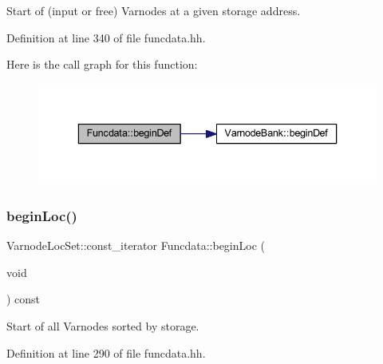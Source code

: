 Start of (input or free) Varnodes at a given storage address. 



Definition at line 340 of file funcdata.\+hh.

Here is the call graph for this function\+:
\nopagebreak
\begin{figure}[H]
\begin{center}
\leavevmode
\includegraphics[width=336pt]{class_funcdata_a52feb85441fe82ca75ec8334244d0426_cgraph}
\end{center}
\end{figure}
\mbox{\label{class_funcdata_ac34a257742ad827bd278d0b35e15af74}} 
\subsubsection{\texorpdfstring{beginLoc()}{beginLoc()}\hspace{0.1cm}{\footnotesize\ttfamily [1/6]}}
{\footnotesize\ttfamily Varnode\+Loc\+Set\+::const\+\_\+iterator Funcdata\+::begin\+Loc (\begin{DoxyParamCaption}\item[{void}]{ }\end{DoxyParamCaption}) const\hspace{0.3cm}{\ttfamily [inline]}}



Start of all Varnodes sorted by storage. 



Definition at line 290 of file funcdata.\+hh.

